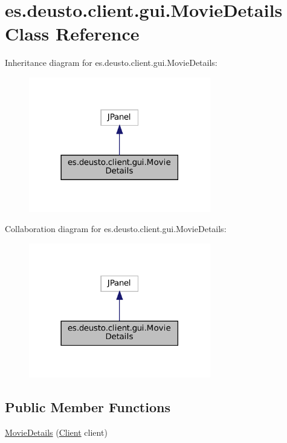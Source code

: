 \hypertarget{classes_1_1deusto_1_1client_1_1gui_1_1_movie_details}{}\section{es.\+deusto.\+client.\+gui.\+Movie\+Details Class Reference}
\label{classes_1_1deusto_1_1client_1_1gui_1_1_movie_details}


Inheritance diagram for es.\+deusto.\+client.\+gui.\+Movie\+Details\+:
\nopagebreak
\begin{figure}[H]
\begin{center}
\leavevmode
\includegraphics[width=225pt]{classes_1_1deusto_1_1client_1_1gui_1_1_movie_details__inherit__graph}
\end{center}
\end{figure}


Collaboration diagram for es.\+deusto.\+client.\+gui.\+Movie\+Details\+:
\nopagebreak
\begin{figure}[H]
\begin{center}
\leavevmode
\includegraphics[width=225pt]{classes_1_1deusto_1_1client_1_1gui_1_1_movie_details__coll__graph}
\end{center}
\end{figure}
\subsection*{Public Member Functions}
\begin{DoxyCompactItemize}
\item 
\mbox{\hyperlink{classes_1_1deusto_1_1client_1_1gui_1_1_movie_details_a70cbaf928eec4995db7a779d0f175ee9}{Movie\+Details}} (\mbox{\hyperlink{classes_1_1deusto_1_1client_1_1_client}{Client}} client)
\end{DoxyCompactItemize}


